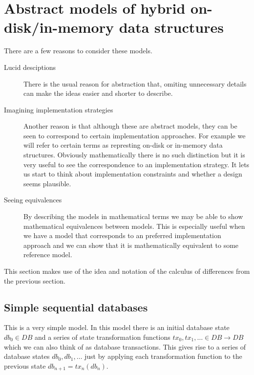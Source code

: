 \documentclass[11pt,a4paper]{article}
\begin{document}
\section{Abstract models of hybrid on-disk/in-memory data structures}

There are a few reasons to consider these models.
\begin{description}
\item[Lucid desciptions]
There is the usual reason for abstraction that, omiting unnecessary details can
make the ideas easier and shorter to describe.

\item[Imagining implementation strategies]
Another reason is that although these are abstract models, they can be seen
to correspond to certain implementation approaches. For example we will refer
to certain terms as represting on-disk or in-memory data structures. Obviously
mathematically there is no such distinction but it is very useful to see the
correspondence to an implementation strategy. It lets us start to think about
implementation constraints and whether a design seems plausible.

\item[Seeing equivalences]
By describing the models in mathematical terms we may be able to show
mathematical equivalences between models. This is especially useful when we
have a model that corresponds to an preferred implementation approach and we
can show that it is mathematically equivalent to some reference model.
\end{description}
This section makes use of the idea and notation of the calculus of differences
from the previous section.

\subsection{Simple sequential databases}

This is a very simple model. In this model there is an initial database state
$\mathit{db}_0 \in \mathit{DB}$ and a series of state transformation functions
$\mathit{tx}_0, \mathit{tx}_1, \ldots \in \mathit{DB} \to \mathit{DB} $ which we can also think of as database
transactions. This gives rise to a series of database states
$\mathit{db}_0, \mathit{db}_1, \ldots$ just by applying each transformation
function to the previous state
$\mathit{db}_{n+1} = \mathit{tx}_n(\mathit{db}_n)$.
\end{document}
